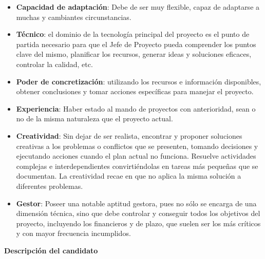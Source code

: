 \begin{itemize}
                \item \textbf{Capacidad de adaptación}:
                Debe de ser muy flexible, capaz de adaptarse a muchas y cambiantes circunstancias.
                
                \item \textbf{Técnico}:
                el dominio de la tecnología principal del proyecto es el punto de partida necesario para que el Jefe de Proyecto pueda comprender los puntos clave del mismo, planificar los recursos, generar ideas y soluciones eficaces, controlar la calidad, etc.
                                
                \item \textbf{Poder de concretización}:
                utilizando los recursos e información disponibles, obtener conclusiones y tomar acciones específicas para manejar el proyecto.
                                
                \item \textbf{Experiencia}:
                Haber estado al mando de proyectos con anterioridad, sean o no de la misma naturaleza que el proyecto actual.
                
                \item \textbf{Creatividad}:
                Sin dejar de ser realista, encontrar y proponer soluciones creativas a los problemas o conflictos que se presenten, tomando decisiones y ejecutando acciones cuando el plan actual no funciona.
                Resuelve actividades complejas e interdependientes convirtiéndolas en tareas más pequeñas que se documentan.
                La creatividad recae en que no aplica la misma solución a diferentes problemas.
                
                \item \textbf{Gestor}:
                Poseer una notable aptitud gestora, pues no sólo se encarga de una dimensión técnica, sino que debe controlar y conseguir todos los objetivos del proyecto, incluyendo los financieros y de plazo, que suelen ser los más críticos y con mayor frecuencia incumplidos.
			\end{itemize}



\textbf{Descripción del candidato}


